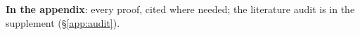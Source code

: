 \documentclass{article}
\begin{document}
\noindent \textbf{In the appendix}: every proof, cited where needed; the literature audit is in the supplement (§\ref{app:audit}).
\end{document}
